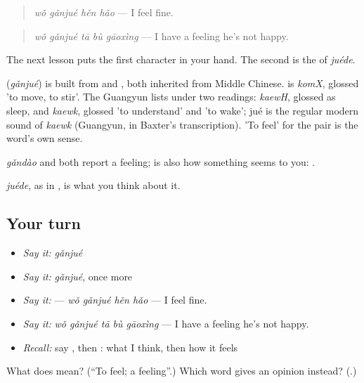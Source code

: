 \begin{quote}
\textbf{} \emph{wǒ gǎnjué hěn hǎo} — I feel fine.
\end{quote}

\begin{quote}
\emph{wǒ gǎnjué tā bù gāoxìng} — I have a feeling he's not happy.
\end{quote}

The next lesson puts the first character in your hand. The second is the  of \emph{juéde}.

\begin{cousinweb}
\textbf{} (\emph{gǎnjué}) is built from  and , both inherited from Middle Chinese.  is \emph{komX}, glossed 'to move, to stir'. The Guangyun lists  under two readings: \emph{kaewH}, glossed as sleep, and \emph{kaewk}, glossed 'to understand' and 'to wake'; jué is the regular modern sound of \emph{kaewk} (Guangyun, in Baxter's transcription). 'To feel' for the pair is the word's own sense.
\end{cousinweb}

\begin{grammarlens}[title={What you've built}]
\emph{gǎndào} and  both report a feeling;  is also how something seems to you: .

\emph{juéde}, as in , is what you think about it.
\end{grammarlens}

\subsection*{Your turn}
\begin{itemize}
\raggedright
  \item \emph{Say it:} \emph{gǎnjué}
  \item \emph{Say it:} \emph{gǎnjué}, once more
  \item \emph{Say it:}  — \emph{wǒ gǎnjué hěn hǎo} — I feel fine.
  \item \emph{Say it:} \emph{wǒ gǎnjué tā bù gāoxìng} — I have a feeling he's not happy.
  \item \emph{Recall:} say , then : what I think, then how it feels
\end{itemize}

\begin{tcolorbox}[breakable,colback=teal!4,colframe=teal!35!black,title={Before you move on}]
What does  mean? (\textquotedblleft{}To feel; a feeling\textquotedblright{}.) Which word gives an opinion instead? (\textbf{}.)
\end{tcolorbox}
